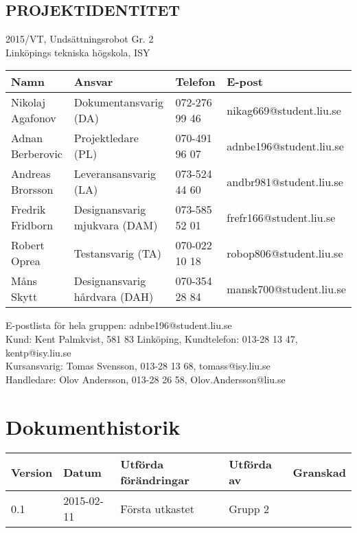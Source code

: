 \documentclass[11pt]{article}
\begin{document}
\pagebreak
\begin{center}

\section*{PROJEKTIDENTITET}
2015/VT, Undsättningsrobot Gr. 2
\\
Linköpings tekniska högskola, ISY
\\[0.5in]
\begin{table}[h]
\begin{tabular}{|l|l|l|l|} \hline
Namn & Ansvar & Telefon & E-post \\[0.1in] \hline
Nikolaj Agafonov & Dokumentansvarig (DA) & 072-276 99 46 & nikag669@student.liu.se \\ \hline
Adnan Berberovic & Projektledare (PL) & 070-491 96 07 & adnbe196@student.liu.se \\ \hline
Andreas Brorsson & Leveransansvarig (LA) & 073-524 44 60 & andbr981@student.liu.se \\ \hline
Fredrik Fridborn & Designansvarig mjukvara (DAM) & 073-585 52 01 & frefr166@student.liu.se \\ \hline
Robert Oprea & Testansvarig (TA) & 070-022 10 18 & robop806@student.liu.se \\ \hline
Måns Skytt & Designansvarig hårdvara (DAH) & 070-354 28 84 & mansk700@student.liu.se \\ \hline
\end{tabular}
\end{table}

E-postlista för hela gruppen: adnbe196@student.liu.se
\\[1in]
Kund: Kent Palmkvist, 581 83 Linköping,
Kundtelefon: 013-28 13 47, kentp@isy.liu.se
\\[1in]
Kursansvarig: Tomas Svensson, 013-28 13 68, tomass@isy.liu.se
\\
Handledare: Olov Andersson, 013-28 26 58, Olov.Andersson@liu.se
\end{center}
\pagebreak

\tableofcontents

\pagebreak

\section*{Dokumenthistorik}
\begin{table}[h]
\begin{tabular}{|l|l|l|l|l|} \hline

Version & 
Datum & 
Utförda förändringar & 
Utförda av & 
Granskad \\[0.1in] \hline
0.1 &
2015-02-11 & 
Första utkastet & 
Grupp 2 & 
\\ \hline

\end{tabular}
\end{table}
\end{document}

